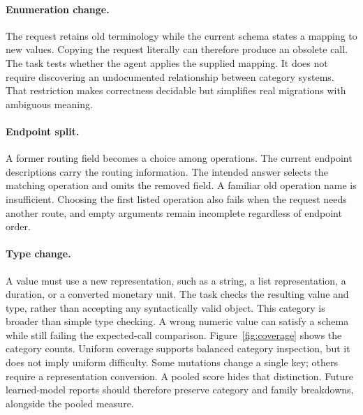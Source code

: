 \documentclass{article}
\begin{document}
\paragraph{Enumeration change.} The request retains old terminology while the current schema states a mapping to new values. Copying the request literally can therefore produce an obsolete call. The task tests whether the agent applies the supplied mapping. It does not require discovering an undocumented relationship between category systems. That restriction makes correctness decidable but simplifies real migrations with ambiguous meaning.
\paragraph{Endpoint split.} A former routing field becomes a choice among operations. The current endpoint descriptions carry the routing information. The intended answer selects the matching operation and omits the removed field. A familiar old operation name is insufficient. Choosing the first listed operation also fails when the request needs another route, and empty arguments remain incomplete regardless of endpoint order.
\paragraph{Type change.} A value must use a new representation, such as a string, a list representation, a duration, or a converted monetary unit. The task checks the resulting value and type, rather than accepting any syntactically valid object. This category is broader than simple type checking. A wrong numeric value can satisfy a schema while still failing the expected-call comparison.
Figure~\ref{fig:coverage} shows the category counts. Uniform coverage supports balanced category inspection, but it does not imply uniform difficulty. Some mutations change a single key; others require a representation conversion. A pooled score hides that distinction. Future learned-model reports should therefore preserve category and family breakdowns, alongside the pooled measure.\par
\end{document}
